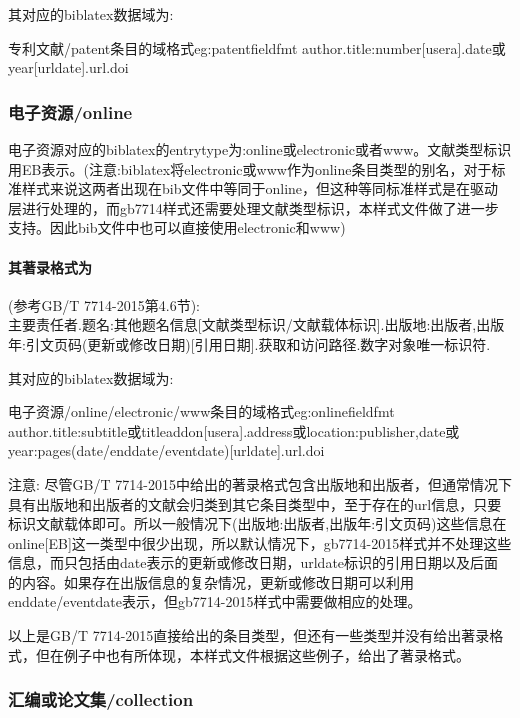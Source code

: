其对应的biblatex数据域为:
\begin{codetex}{专利文献/patent条目的域格式}{eg:patentfieldfmt}
author.title:number[usera].date或year[urldate].url.doi
\end{codetex}

\subsubsection{电子资源/online}
\begin{refentry}{}{}
电子资源对应的biblatex的entrytype为:online或electronic或者www。文献类型标识用EB表示。(注意:biblatex将electronic或www作为online条目类型的别名，对于标准样式来说这两者出现在bib文件中等同于online，但这种等同标准样式是在驱动层进行处理的，而gb7714样式还需要处理文献类型标识，本样式文件做了进一步支持。因此bib文件中也可以直接使用electronic和www)

\paragraph{其著录格式为}(参考GB/T 7714-2015第4.6节):\\
主要责任者.题名:其他题名信息[文献类型标识/文献载体标识].出版地:出版者,出版年:引文页码(更新或修改日期)[引用日期].获取和访问路径.数字对象唯一标识符.
\end{refentry}

其对应的biblatex数据域为:
\begin{codetex}{电子资源/online/electronic/www条目的域格式}{eg:onlinefieldfmt}
author.title:subtitle或titleaddon[usera].address或location:publisher,date或year:pages(date/enddate/eventdate)[urldate].url.doi
\end{codetex}

注意: 尽管GB/T 7714-2015中给出的著录格式包含出版地和出版者，但通常情况下具有出版地和出版者的文献会归类到其它条目类型中，至于存在的url信息，只要标识文献载体即可。所以一般情况下(出版地:出版者,出版年:引文页码)这些信息在online[EB]这一类型中很少出现，所以默认情况下，gb7714-2015样式并不处理这些信息，而只包括由date表示的更新或修改日期，urldate标识的引用日期以及后面的内容。如果存在出版信息的复杂情况，更新或修改日期可以利用enddate/eventdate表示，但gb7714-2015样式中需要做相应的处理。

以上是GB/T 7714-2015直接给出的条目类型，但还有一些类型并没有给出著录格式，但在例子中也有所体现，本样式文件根据这些例子，给出了著录格式。

\subsubsection{汇编或论文集/collection}

